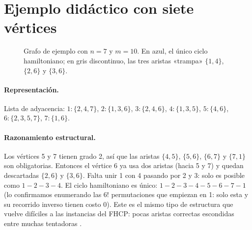 \section{Ejemplo didáctico con siete vértices}

\begin{figure}[h]
\centering
{}
\caption{Grafo de ejemplo con $n=7$ y $m=10$. En azul, el único ciclo hamiltoniano; en
gris discontinuo, las tres aristas «trampa» $\{1,4\}$, $\{2,6\}$ y $\{3,6\}$.}
\label{aco:fig:ejemplo}
\end{figure}

\paragraph{Representación.} Lista de adyacencia:
$1\!:\!\{2,4,7\}$, $2\!:\!\{1,3,6\}$, $3\!:\!\{2,4,6\}$, $4\!:\!\{1,3,5\}$, $5\!:\!\{4,6\}$,
$6\!:\!\{2,3,5,7\}$, $7\!:\!\{1,6\}$.

\paragraph{Razonamiento estructural.} Los vértices 5 y 7 tienen grado 2, así que las aristas
$\{4,5\}$, $\{5,6\}$, $\{6,7\}$ y $\{7,1\}$ son obligatorias. Entonces el vértice 6 ya usa dos aristas
(hacia 5 y 7) y quedan descartadas $\{2,6\}$ y $\{3,6\}$. Falta unir 1 con 4 pasando por 2 y
3: solo es posible como $1\!-\!2\!-\!3\!-\!4$. El ciclo hamiltoniano es único:
$1\!-\!2\!-\!3\!-\!4\!-\!5\!-\!6\!-\!7\!-\!1$ (lo confirmamos enumerando las $6!$
permutaciones que empiezan en 1: solo esta y su recorrido inverso tienen costo 0). Este es
el mismo tipo de estructura que vuelve difíciles a las instancias del FHCP: pocas aristas
correctas escondidas entre muchas tentadoras \cite{aco8}.

